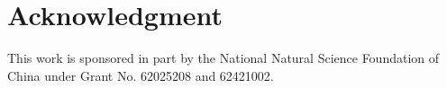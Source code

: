 \documentclass[conference]{IEEEtran}
\begin{document}
\section*{Acknowledgment}
This work is sponsored in part by the National Natural Science Foundation of China under Grant No. 62025208 and 62421002.




\end{document}
